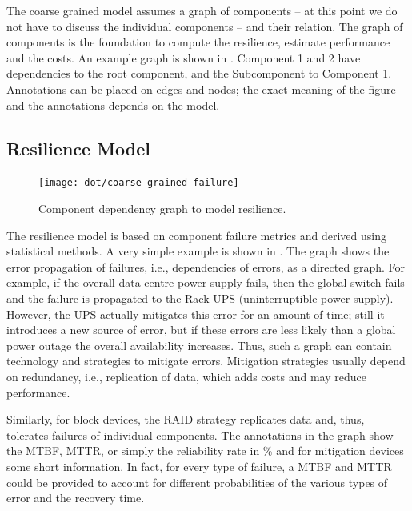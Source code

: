 \documentclass{../../template/esiwace-report}
\begin{document}
The coarse grained model assumes a graph of components -- at this point we do not have to discuss the individual components -- and their relation.
The graph of components is the foundation to compute the resilience, estimate performance and the costs.
An example graph is shown in .
Component 1 and 2 have dependencies to the root component, and the Subcomponent to Component 1.
Annotations can be placed on edges and nodes; the exact meaning of the figure and the annotations depends on the model.




\newpage
\subsection{Resilience Model}





\begin{figure}
	\centering
	\texttt{[image: dot/coarse-grained-failure]}
	\caption{Component dependency graph to model resilience.}
	\label{fig:resilience example}
\end{figure}


The resilience model is based on component failure metrics and derived using statistical methods.
A very simple example is shown in .
The graph shows the error propagation of failures, i.e., dependencies of errors, as a directed graph.
For example, if the overall data centre power supply fails, then the global switch fails and the failure is propagated to the Rack UPS (uninterruptible power supply).
However, the UPS actually mitigates this error for an amount of time; still it introduces a new source of error, but if these errors are less likely than a global power outage the overall availability increases.
Thus, such a graph can contain technology and strategies to mitigate errors.
Mitigation strategies usually depend on redundancy, i.e., replication of data, which adds costs and may reduce performance.

Similarly, for block devices, the RAID strategy replicates data and, thus, tolerates failures of individual components.
The annotations in the graph show the MTBF, MTTR, or simply the reliability rate in \% and for mitigation devices some short information.
In fact, for every type of failure, a MTBF and MTTR could be provided to account for different probabilities of the various types of error and the recovery time.
\end{document}
